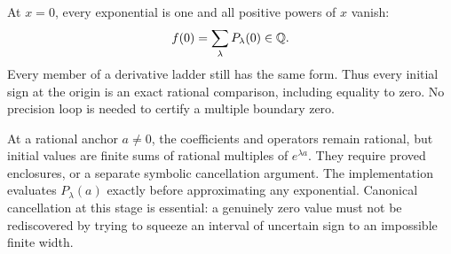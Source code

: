 At $x=0$, every exponential is one and all positive powers of $x$ vanish:
\[
 f(0)=\sum_{\lambda}P_\lambda(0)\in\mathbb Q.
\]
Every member of a derivative ladder still has the same form. Thus every initial
sign at the origin is an exact rational comparison, including equality to zero.
No precision loop is needed to certify a multiple boundary zero.

At a rational anchor $a\ne0$, the coefficients and operators remain rational,
but initial values are finite sums of rational multiples of $e^{\lambda a}$.
They require proved enclosures, or a separate symbolic cancellation argument.
The implementation evaluates $P_\lambda(a)$ exactly before approximating any
exponential. Canonical cancellation at this stage is essential: a genuinely
zero value must not be rediscovered by trying to squeeze an interval of
uncertain sign to an impossible finite width.
